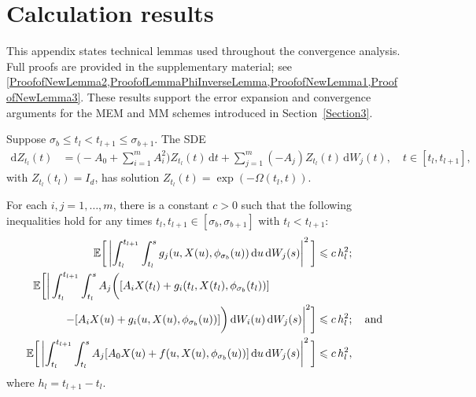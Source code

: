 \documentclass[onefignum]{siamart250211}
\providecommand{\abs}[1]{\left|#1\right|}
\begin{document}
\section{Calculation results}\label{AppendixProofsforConvergenceAnalysis}

This appendix states technical lemmas used throughout the convergence analysis. Full proofs are provided in the supplementary material; see \cref{ProofofNewLemma2,ProofofLemmaPhiInverseLemma,ProofofNewLemma1,ProofofNewLemma3}. These results support the error expansion and convergence arguments for the MEM and MM schemes introduced in Section~\ref{Section3}.




\begin{lemma}\label{LemmaPhiInverse}
Suppose $\sigma_b\leqslant t_l<t_{l+1}\leqslant\sigma_{b+1}$. The SDE
\begin{align}
\mathrm{d}Z_{t_l}(t)&=\bigg(-A_0+\sum_{i=1}^mA_i^2\bigg)Z_{t_l}(t)\,\mathrm{d}t+\sum_{j=1}^m(-A_j)Z_{t_l}(t)\,\mathrm{d}W_j(t),\quad t\in[t_l,t_{l+1}],\label{PhiInverseSDE}
\end{align}
with $Z_{t_l}(t_l)=I_d$, has solution $Z_{t_l}(t)=\exp(-\Omega(t_l,t))$.
\end{lemma}

\begin{lemma}\label{NewLemma1}
For each $i,j=1,\ldots,m$, there is a constant $c>0$ such that the following inequalities hold for any times $t_l,t_{l+1}\in[\sigma_b,\sigma_{b+1}]$ with $t_l < t_{l+1}$:
\begin{align}
\mathbb{E}\bigg[\abs{\int_{t_l}^{t_{l+1}}\int_{t_l}^sg_j(u,X(u),\phi_{\sigma_b}(u))\,\mathrm{d}u\,\mathrm{d}W_j(s)}^2\bigg]&\leqslant c\,h_l^2;\label{NewLemma1Bound5}\\
\mathbb{E}\bigg[\bigg|\int_{t_l}^{t_{l+1}}\int_{t_l}^sA_j\bigg([A_iX(t_l)+g_i(t_l,X(t_l),\phi_{\sigma_b}(t_l))]\hspace{1.5cm}&\label{NewLemma1Bound6}\\
-[A_iX(u)+g_i(u,X(u),\phi_{\sigma_b}(u))]\bigg)\,\mathrm{d}W_i(u)\,\mathrm{d}W_j(s)\bigg|^2\bigg]&\leqslant c\,h_l^2;\quad\textrm{and}\nonumber\\
\mathbb{E}\bigg[\abs{\int_{t_l}^{t_{l+1}}\int_{t_l}^sA_j[A_0X(u)+f(u,X(u),\phi_{\sigma_b}(u))]\,\mathrm{d}u\,\mathrm{d}W_j(s)}^2\bigg]&\leqslant c\,h_l^2,\label{NewLemma1Bound7}
\end{align}
where $h_l=t_{l+1}-t_l$.
\end{lemma}
\end{document}
